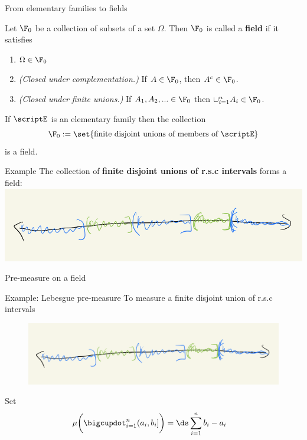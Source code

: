 \documentclass[10pt]{beamer}
\begin{document}
\begin{frame}{From elementary families to fields}

\begin{definition}
Let $\F_0$ be a collection of subsets of a set $\Omega$.  Then $\F_0$ is called a \textbf{field}  if it satisfies

\begin{enumerate}
	\item $\Omega \in \F_0$ 
	\item \textit{(Closed under complementation.)} If $A \in \F_0$, then $A^c \in \F_0$.
	\item \textit{(Closed under \alert{finite} unions.)} If $A_1,A_2, ... \in \F_0$ then $\cup_{i=1}^n A_i \in \F_0$.  
\end{enumerate}
\end{definition}

\pause 
\begin{proposition}
If $\scriptE$ is an elementary family then the collection 
\[ \F_0 := \set{ \text{finite disjoint unions of members of } \scriptE} \]
is a field.
\label{prop:from_elementary_families_to_fields}	
\end{proposition}


\pause 
\begin{block}{Example}
The collection of \textbf{finite disjoint unions of r.s.c intervals} forms a field:
\centering
\includegraphics[width=.6\textwidth]{images/rsc_intervals}
\end{block}	
\end{frame}


\begin{frame}{Pre-measure on a field}
\begin{block}{Example: Lebesgue pre-measure}
To measure a finite disjoint union of r.s.c intervals
\begin{figure}
\centering
\includegraphics[width=.8\textwidth]{images/rsc_intervals}
\end{figure}
Set
\begin{align*}
	\mu \bigg(\bigcupdot_{i=1}^n (a_i, b_i] \bigg) &= \ds\sum_{i=1}^n b_i - a_i 
\end{align*}
\end{block}



\end{frame}
\end{document}
